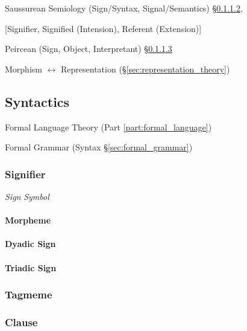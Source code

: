 Saussurean Semiology (Sign/Syntax, Signal/Semantics)
\S\ref{sec:dyadic_sign},

[Signifier, Signified (Intension), Referent (Extension)]

Peircean (Sign, Object, Interpretant) \S\ref{sec:triadic_sign}

Morphism $\leftrightarrow$ Representation
(\S\ref{sec:representation_theory})



\subsection{Syntactics}\label{sec:syntactics}

Formal Language Theory (Part \ref{part:formal_language})

Formal Grammar (Syntax \S\ref{sec:formal_grammar})



\subsubsection{Signifier}\label{sec:signifier}

\emph{Sign} \emph{Symbol}



\paragraph{Morpheme}\label{sec:morpheme}\hfill

\paragraph{Dyadic Sign}\label{sec:dyadic_sign}\hfill

\paragraph{Triadic Sign}\label{sec:triadic_sign}\hfill



\subsubsection{Tagmeme}\label{sec:tagmeme}

\subsubsection{Clause}\label{sec:grammatical_clause}

